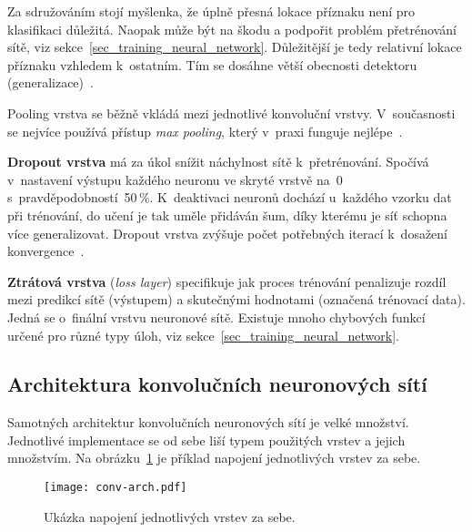 Za sdružováním stojí myšlenka, že úplně přesná lokace příznaku není pro klasifikaci důležitá. Naopak může být na škodu a podpořit problém přetrénování sítě, viz sekce~\ref{sec_training_neural_network}. Důležitější je tedy relativní lokace příznaku vzhledem k~ostatním. Tím se dosáhne větší obecnosti detektoru (generalizace)~\cite{paperLecunNature}.

Pooling vrstva se běžně vkládá mezi jednotlivé konvoluční vrstvy. V~současnosti se nejvíce používá přístup \textit{max pooling}, který v~praxi funguje nejlépe~\cite{paperPoolingTypes}.


\textbf{Dropout vrstva} má za úkol snížit náchylnost sítě k~přetrénování. Spočívá v~nastavení výstupu každého neuronu ve skryté vrstvě na~0 s~pravděpodobností~50\,\%. K~deaktivaci neuronů dochází u~každého vzorku dat při trénování, do učení je tak uměle přidáván šum, díky kterému je síť schopna více generalizovat. Dropout vrstva zvýšuje počet potřebných iterací k~dosažení konvergence~\cite{paperKriz}.


\textbf{Ztrátová vrstva} (\textit{loss layer}) specifikuje jak proces trénování penalizuje rozdíl mezi predikcí sítě (výstupem) a skutečnými hodnotami (označená trénovací data). Jedná se o~finální vrstvu neuronové sítě. Existuje mnoho chybových funkcí určené pro různé typy úloh, viz sekce~\ref{sec_training_neural_network}.


\subsection*{Architektura konvolučních neuronových sítí}

Samotných architektur konvolučních neuronových sítí je velké množství. Jednotlivé implementace se od sebe liší typem použitých vrstev a jejich množstvím. Na obrázku~\ref{fig_conv_arch} je příklad napojení jednotlivých vrstev za sebe.

\begin{figure}[H]
    \centering
    \texttt{[image: conv-arch.pdf]}
    \caption[Ukázka napojení vrstev konvolučních sítí]{Ukázka napojení jednotlivých vrstev za sebe.}
    \label{fig_conv_arch}
\end{figure}

